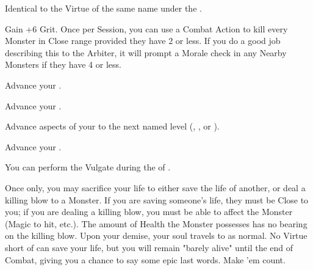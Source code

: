 \begin{multicols*}{2}

Identical to the Virtue of the same name under the .


Gain +6 \MAX Grit.  Once per Session, you can use a Combat Action to kill every Monster in Close range provided they have 2 \HD or less.  If you do a good job describing this to the Arbiter, it will prompt a Morale check in any Nearby Monsters if they have 4 \HD or less.  


Advance your  \DCUP.


Advance your  \DCUP.



Advance  aspects of your  to the next named level (\DEATH, \INJURY, or \INSANITY).


Advance your  \DCUP.


You can perform the  Vulgate during the  of . 


Once only, you may sacrifice your life to either save the life of another, or deal a killing blow to a Monster. If you are saving someone's life, they must be Close to you; if you are dealing a killing blow, you must be able to affect the Monster (Magic to hit, etc.). The amount of Health the Monster possesses has no bearing on the killing blow. Upon your demise, your soul travels to  as normal. No Virtue short of  can save your life, but you will remain "barely alive" until the end of Combat, giving you a chance to say some epic last words.  Make 'em count.



\end{multicols*}
